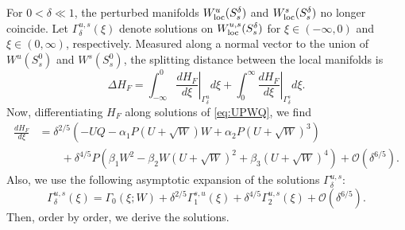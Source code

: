\documentclass[11pt]{article}
\numberwithin{equation}{section}
\begin{document}
For $0<\delta \ll 1$, the perturbed manifolds $W^u_{\rm loc}(S_s^\delta)$ and $W^s_{\rm loc}(S_s^\delta)$ no longer coincide.
Let $\Gamma^{u,s}_\delta(\xi)$ denote solutions on
$W^{u,s}_{\rm loc}(S_s^\delta)$ for $\xi \in (-\infty,0)$ and $\xi\in (0,\infty)$, respectively.
Measured along a normal vector to the union of $W^u(S_s^0)$ and $W^s(S_s^0)$, the splitting distance between the local manifolds is
\begin{equation}\label{eq:def-DeltaHF}
    \Delta H_F = 
    \int_{-\infty}^0 \left. \frac{dH_F}{d\xi} \right\vert_{\Gamma^u_\delta} d\xi 
    + \int_0^{\infty} \left. \frac{dH_F}{d\xi} \right\vert_{\Gamma^s_\delta} d\xi.
\end{equation}
Now, differentiating $H_F$ along solutions of \eqref{eq:UPWQ}, we find
\begin{equation}
    \begin{split}
\frac{dH_F}{d\xi} &= \delta^{2/5} \left( - UQ - \alpha_1 P (U + \sqrt{W} ) W + \alpha_2 P (U + \sqrt{W})^3 \right)  \\
    &\qquad + \delta^{4/5} P \left( \beta_1 W^2 - \beta_2 W (U + \sqrt{W})^2 + \beta_3 (U + \sqrt{W})^4 \right) 
    + \mathcal{O}(\delta^{6/5}).
    \end{split}
\end{equation}
Also, we use the following asymptotic expansion of the solutions 
$\Gamma_\delta^{u,s}$: 
\begin{equation*}
    \Gamma_\delta^{u,s} (\xi)  
    = \Gamma_0 (\xi;W) + \delta^{2/5} \Gamma_1^{s,u}(\xi) + \delta^{4/5} \Gamma_2^{u,s}(\xi) + \mathcal{O}(\delta^{6/5}).
\end{equation*}
Then, order by order, we derive the solutions.
\end{document}
